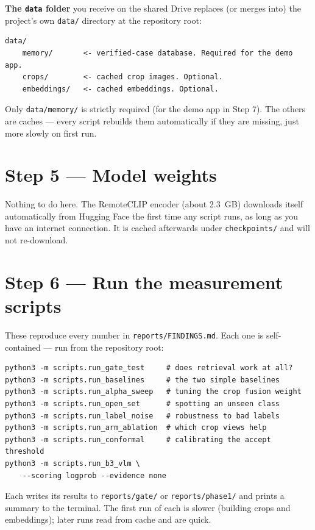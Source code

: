 \documentclass[11pt,a4paper]{article}
\begin{document}
\textbf{The \texttt{data} folder} you receive on the shared Drive replaces
(or merges into) the project's own \texttt{data/} directory at the
repository root:

\begin{verbatim}
data/
    memory/       <- verified-case database. Required for the demo app.
    crops/        <- cached crop images. Optional.
    embeddings/   <- cached embeddings. Optional.
\end{verbatim}

Only \texttt{data/memory/} is strictly required (for the demo app in Step
7). The others are caches --- every script rebuilds them automatically if
they are missing, just more slowly on first run.

\section{Step 5 --- Model weights}

Nothing to do here. The RemoteCLIP encoder (about 2.3~GB) downloads itself
automatically from Hugging Face the first time any script runs, as long as
you have an internet connection. It is cached afterwards under
\texttt{checkpoints/} and will not re-download.

\section{Step 6 --- Run the measurement scripts}

These reproduce every number in \texttt{reports/FINDINGS.md}. Each one is
self-contained --- run from the repository root:

\begin{verbatim}
python3 -m scripts.run_gate_test     # does retrieval work at all?
python3 -m scripts.run_baselines     # the two simple baselines
python3 -m scripts.run_alpha_sweep   # tuning the crop fusion weight
python3 -m scripts.run_open_set      # spotting an unseen class
python3 -m scripts.run_label_noise   # robustness to bad labels
python3 -m scripts.run_arm_ablation  # which crop views help
python3 -m scripts.run_conformal     # calibrating the accept threshold
python3 -m scripts.run_b3_vlm \
    --scoring logprob --evidence none
\end{verbatim}

Each writes its results to \texttt{reports/gate/} or \texttt{reports/phase1/}
and prints a summary to the terminal. The first run of each is slower
(building crops and embeddings); later runs read from cache and are quick.
\end{document}
